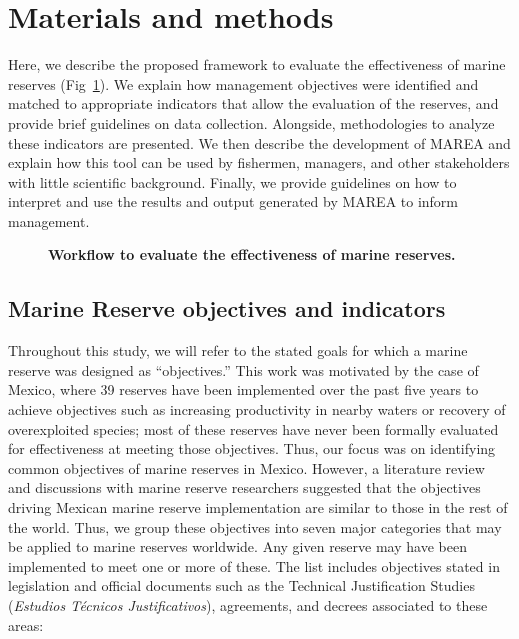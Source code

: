 \documentclass[10pt,letterpaper]{article}
\begin{document}
\section*{Materials and methods}\label{materials-and-methods}

Here, we describe the proposed framework to evaluate the effectiveness of marine reserves (Fig~\ref{fig1}). We explain how management objectives were identified and matched to appropriate indicators that allow the evaluation of the reserves, and provide brief guidelines on data collection. Alongside, methodologies to analyze these indicators are presented. We then describe the development of MAREA and explain how this tool can be used by fishermen, managers, and other stakeholders with little scientific background. Finally, we provide guidelines on how to interpret and use the results and output generated by MAREA to inform management.

\begin{figure}[!h]
\caption{{\bf Workflow to evaluate the effectiveness of marine reserves.}}
\label{fig1}
\end{figure}

\subsection*{Marine Reserve objectives and indicators}\label{marine-reserve-objectives-and-indicators}

Throughout this study, we will refer to the stated goals for which a marine reserve was designed as ``objectives.'' This work was motivated by the case of Mexico, where 39 reserves have been implemented over the past five years to achieve objectives such as increasing productivity in nearby waters or recovery of overexploited species; most of these reserves have never been formally evaluated for effectiveness at meeting those objectives. Thus, our focus was on identifying common objectives of marine reserves in Mexico. However, a literature review and discussions with marine reserve researchers suggested that the objectives driving Mexican marine reserve implementation are similar to those in the rest of the world. Thus, we group these objectives into seven major categories that may be applied to marine reserves worldwide. Any given reserve may have been implemented to meet one or more of these. The list includes objectives stated in legislation \cite{nom,lgeepa} and official documents such as the Technical Justification Studies (\emph{Estudios Técnicos Justificativos}), agreements, and decrees associated to these areas:
\end{document}
